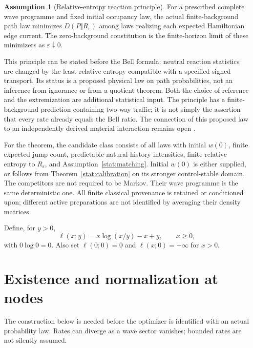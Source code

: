 \documentclass[11pt,oneside,openany]{book}
\theoremstyle{definition}
\newtheorem{assumption}[theorem]{Assumption}
\theoremstyle{remark}\newtheorem{remark}[theorem]{Remark}
\begin{document}
\begin{assumption}[Relative-entropy reaction principle]\label{stat:entropy-law}
For a prescribed complete wave programme and fixed initial occupancy law,
the actual finite-background path law minimizes
$D(P\Vert R_\varepsilon)$ among laws realizing each expected Hamiltonian edge
current. The zero-background constitution is the finite-horizon limit of
these minimizers as $\varepsilon\downarrow0$.
\end{assumption}

This principle can be stated before the Bell formula: neutral reaction
statistics are changed by the least relative entropy compatible with a
specified signed transport. Its status is a proposed physical law on path
probabilities, not an inference from ignorance or from a quotient theorem.
Both the choice of reference and the extremization are additional
statistical input. The principle has a finite-background prediction
containing two-way traffic; it is not simply the assertion that every rate
already equals the Bell ratio. The connection of this proposed law to an
independently derived material interaction remains open \cite{M30,BFG}.

For the theorem, the candidate class consists of all laws with initial
$w(0)$, finite expected jump count, predictable natural-history intensities,
finite relative entropy to $R_\varepsilon$, and
Assumption~\ref{stat:matching}. Initial $w(0)$ is either supplied, or follows
from Theorem~\ref{stat:calibration} on its stronger control-stable domain.
The competitors are not required to be Markov. Their wave programme is the
same deterministic one. All finite classical provenance is retained or
conditioned upon; different active preparations are not identified by
averaging their density matrices.

Define, for $y>0$,
\begin{equation}\label{stat:entropy-density}
 \ell(x;y)=x\log(x/y)-x+y,\qquad x\geq0,
\end{equation}
with $0\log0=0$. Also set $\ell(0;0)=0$ and $\ell(x;0)=+\infty$ for $x>0$.

\section{Existence and normalization at nodes}

The construction below is needed before the optimizer is identified with
an actual probability law. Rates can diverge as a wave sector vanishes;
bounded rates are not silently assumed.
\end{document}
